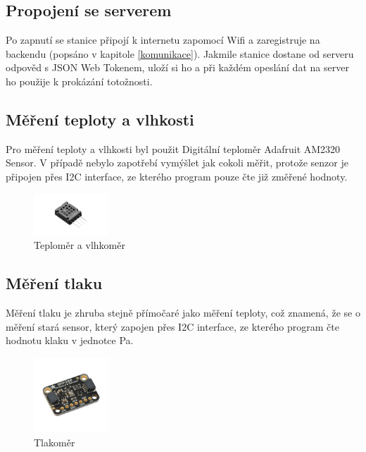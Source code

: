 \subsection{Propojení se serverem}
Po zapnutí se stanice připojí k internetu zapomocí Wifi a zaregistruje na backendu (popsáno v kapitole \ref{komunikace}). Jakmile stanice dostane od serveru odpověd s 
JSON Web Tokenem, uloží si ho a při každém opeslání dat na server ho použije k prokázání totožnosti.

\subsection{Měření teploty a vlhkosti}
Pro měření teploty a vlhkosti byl použit Digitální teploměr Adafruit AM2320 Sensor\cite{teplomer}. V případě nebylo zapotřebí vymýšlet jak cokoli měřit,
protože senzor je připojen přes I2C interface, ze kterého program pouze čte již změřené hodnoty.
\begin{figure}[h] 
    \centering
    \includegraphics[width=0.25\textwidth]{images/Adafruit-AM2320.jpg}
    \caption{Teploměr a vlhkoměr}
\end{figure}

\subsection{Měření tlaku}
Měření tlaku je zhruba stejně přímočaré jako měření teploty, což znamená, že se o měření stará sensor\cite{tlakoměr},
který zapojen přes I2C interface, ze kterého program čte hodnotu klaku v jednotce Pa.

\begin{figure}[h] 
    \centering
    \includegraphics[width=0.25\textwidth]{images/Adafruit-BMP280.jpg}
    \caption{Tlakoměr}
\end{figure}
